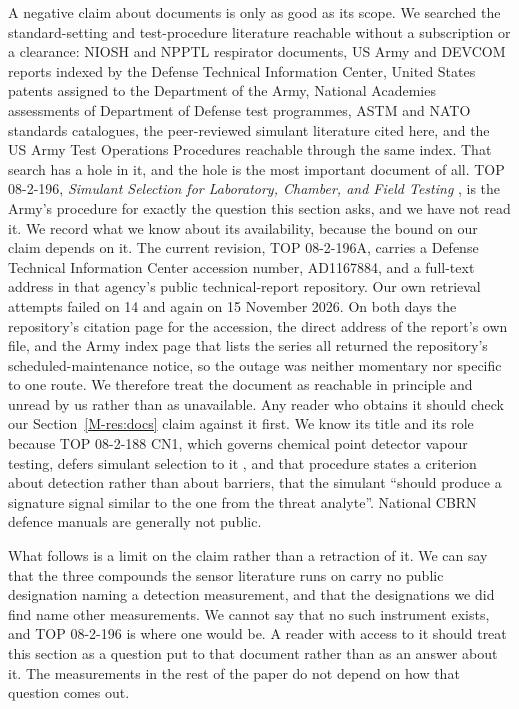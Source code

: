 \documentclass[11pt,a4paper]{article}
\begin{document}
A negative claim about documents is only as good as its scope. We searched the
standard-setting and test-procedure literature reachable without a subscription
or a clearance: NIOSH and NPPTL respirator documents, US Army and DEVCOM reports
indexed by the Defense Technical Information Center, United States patents
assigned to the Department of the Army, National Academies assessments of
Department of Defense test programmes, ASTM and NATO standards catalogues, the
peer-reviewed simulant literature cited here, and the US Army Test Operations
Procedures reachable through the same index. That search has a hole in it, and
the hole is the most important document of all. TOP 08-2-196, \emph{Simulant
Selection for Laboratory, Chamber, and Field Testing} \cite{top082196}, is the
Army's procedure for exactly the question this section asks, and we have not
read it. We record what we know about its availability, because the bound on our
claim depends on it. The current revision, TOP 08-2-196A, carries a Defense
Technical Information Center accession number, AD1167884, and a full-text
address in that agency's public technical-report repository. Our own retrieval
attempts failed
on 14 and again on 15 November 2026. On both days the repository's citation
page for the accession, the direct address of the report's own file, and the
Army index page that lists the series all returned the repository's
scheduled-maintenance notice, so the outage was neither momentary nor specific
to one route. We therefore treat the document as reachable in
principle and unread by us rather than as unavailable. Any reader who obtains it should check our Section~\ref{M-res:docs}
claim against it first. We know its title and its role because TOP 08-2-188 CN1,
which governs chemical point detector vapour testing, defers simulant selection
to it \cite{top082188}, and that procedure states a criterion about detection
rather than about barriers, that the simulant ``should produce a signature
signal similar to the one from the threat analyte''. National CBRN defence
manuals are generally not public.

What follows is a limit on the claim rather than a retraction of it. We can say
that the three compounds the sensor literature runs on carry no public
designation naming a detection measurement, and that the designations we did
find name other measurements. We cannot say that no such instrument exists, and
TOP 08-2-196 is where one would be. A reader with access to it should treat this
section as a question put to that document rather than as an answer about it.
The measurements in the rest of the paper do not depend on how that question
comes out.
\end{document}
